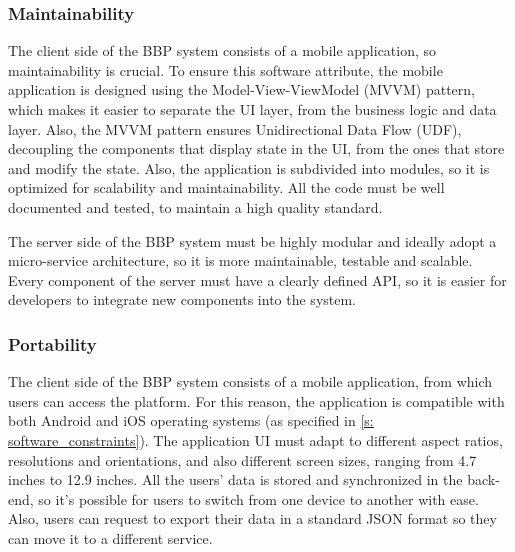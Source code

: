 \subsubsection{Maintainability}
The client side of the BBP system consists of a mobile application, so maintainability is crucial. To ensure this software attribute, the mobile application is designed using the Model-View-ViewModel (MVVM) pattern, which makes it easier to separate the UI layer, from the business logic and data layer. Also, the MVVM pattern ensures Unidirectional Data Flow (UDF), decoupling the components that display state in the UI, from the ones that store and modify the state. Also, the application is subdivided into modules, so it is optimized for scalability and maintainability. All the code must be well documented and tested, to maintain a high quality standard.

The server side of the BBP system must be highly modular and ideally adopt a micro-service architecture, so it is more maintainable, testable and scalable. Every component of the server must have a clearly defined API, so it is easier for developers to integrate new components into the system.

\subsubsection{Portability}
The client side of the BBP system consists of a mobile application, from which users can access the platform. For this reason, the application is compatible with both Android and iOS operating systems (as specified in \ref{s: software_constraints}). The application UI must adapt to different aspect ratios, resolutions and orientations, and also different screen sizes, ranging from 4.7 inches to 12.9 inches. All the users' data is stored and synchronized in the back-end, so it's possible for users to switch from one device to another with ease. Also, users can request to export their data in a standard JSON format so they can move it to a different service.